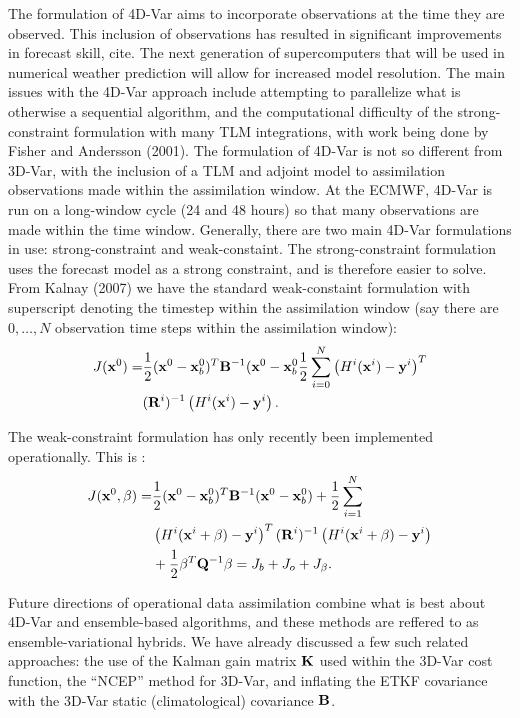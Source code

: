 \documentclass[12pt]{report}
\begin{document}
The formulation of 4D-Var aims to incorporate observations at the time they are observed.
This inclusion of observations has resulted in significant improvements in forecast skill, cite.
The next generation of supercomputers that will be used in numerical weather prediction will allow for increased model resolution.
The main issues with the 4D-Var approach include attempting to parallelize what is otherwise a sequential algorithm, and the computational difficulty of the strong-constraint formulation with many TLM integrations, with work being done by Fisher and Andersson (2001). 
The formulation of 4D-Var is not so different from 3D-Var, with the inclusion of a TLM and adjoint model to assimilation observations made within the assimilation window.
At the ECMWF, 4D-Var is run on a long-window cycle (24 and 48 hours) so that many observations are made within the time window.
Generally, there are two main 4D-Var formulations in use: strong-constraint and weak-constaint.
The strong-constraint formulation uses the forecast model as a strong constraint, and is therefore easier to solve.
From Kalnay (2007) we have the standard weak-constaint formulation with superscript denoting the timestep within the assimilation window (say there are $0,\ldots,N$ observation time steps within the assimilation window):
\begin{align*} J(\mathbf{x}^0) = &\frac{1}{2} (\mathbf{x}^0 - \mathbf{x}^0_b) ^T \mathbf{B} ^{-1} (\mathbf{x}^0 - \mathbf{x}_b^0 \frac{1}{2} \sum _{i=0}^N \left( H^i(\mathbf{x}^i)-\mathbf{y}^i\right)^T\\
&(\mathbf{R}^i) ^{-1} \left( H^i(\mathbf{x}^i)-\mathbf{y}^i \right ) .\end{align*}

The weak-constraint formulation has only recently been implemented operationally.
This is :
\begin{align*} J(\mathbf{x}^0 , \beta) = &\frac{1}{2} (\mathbf{x}^0 - \mathbf{x}^0_b)^T \mathbf{B}^{-1} (\mathbf{x}^0 - \mathbf{x}^0_b) + \frac{1}{2} \sum _{i=1} ^N\\
& \left(H^i(\mathbf{x}^i+\beta)-\mathbf{y}^i\right)^T (\mathbf{R}^i)^{-1} \left(H^i(\mathbf{x}^i+\beta)-\mathbf{y}^i\right) \\
&+\frac{1}{2}\beta^T\mathbf{Q}^{-1}\beta = J_b +J_o+J_\beta.\end{align*}

Future directions of operational data assimilation combine what is best about 4D-Var and ensemble-based algorithms, and these methods are reffered to as ensemble-variational hybrids.
We have already discussed a few such related approaches: the use of the Kalman gain matrix $\mathbf{K}$ used within the 3D-Var cost function, the ``NCEP'' method for 3D-Var, and inflating the ETKF covariance with the 3D-Var static (climatological) covariance $\mathbf{B}$.
\end{document}
